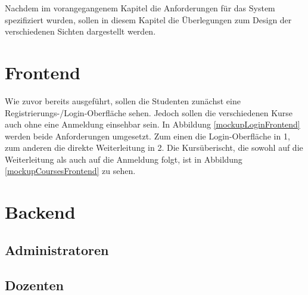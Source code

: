 Nachdem im vorangegangenem Kapitel die Anforderungen für das System spezifiziert wurden, sollen in diesem Kapitel die Überlegungen zum Design der verschiedenen Sichten dargestellt werden.

\section{Frontend}
Wie zuvor bereits ausgeführt, sollen die Studenten zunächst eine Registrierungs-/Login-Oberfläche sehen.
Jedoch sollen die verschiedenen Kurse auch ohne eine Anmeldung einsehbar sein.
In Abbildung \ref{mockupLoginFrontend} werden beide Anforderungen umgesetzt.
Zum einen die Login-Oberfläche in 1, zum anderen die direkte Weiterleitung in 2.
Die Kursüberischt, die sowohl auf die Weiterleitung als auch auf die Anmeldung folgt, ist in Abbildung \ref{mockupCoursesFrontend} zu sehen.


\section{Backend}
	\subsection{Administratoren}
	\subsection{Dozenten}